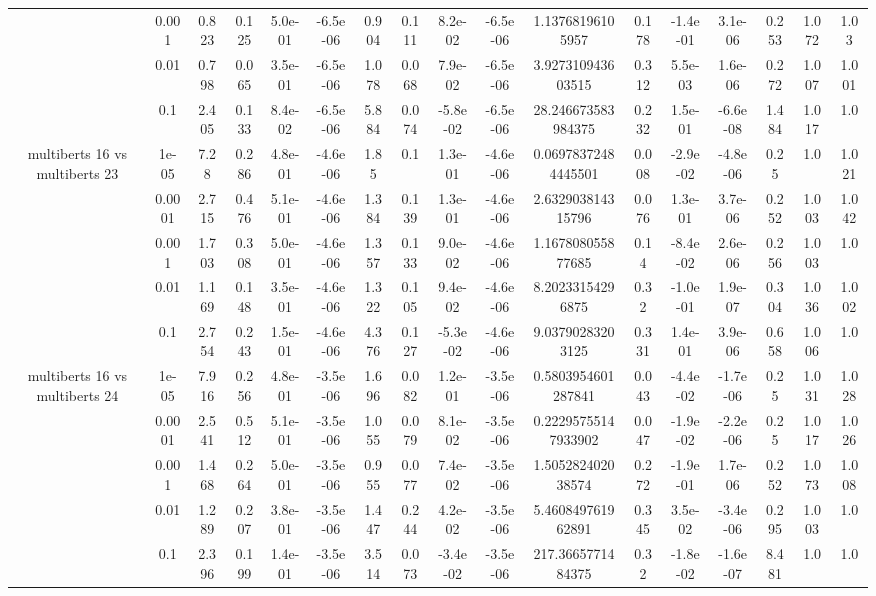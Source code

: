 \begin{tabular}{|c|c|c|c|c|c|c|c|c|c|c|c|c|c|c|c|c|}
 & 0.001 & 0.823 & 0.125 & 5.0e-01 & -6.5e-06 & 0.904 & 0.111 & 8.2e-02 & -6.5e-06 & 1.13768196105957 & 0.178 & -1.4e-01 & 3.1e-06 & 0.253 & 1.072 & 1.03 \\
 & 0.01 & 0.798 & 0.065 & 3.5e-01 & -6.5e-06 & 1.078 & 0.068 & 7.9e-02 & -6.5e-06 & 3.927310943603515 & 0.312 & 5.5e-03 & 1.6e-06 & 0.272 & 1.007 & 1.001 \\
 & 0.1 & 2.405 & 0.133 & 8.4e-02 & -6.5e-06 & 5.884 & 0.074 & -5.8e-02 & -6.5e-06 & 28.246673583984375 & 0.232 & 1.5e-01 & -6.6e-08 & 1.484 & 1.017 & 1.0 \\
\hline
\multirow{5}{*}{multiberts 16 vs multiberts 23} & 1e-05 & 7.28 & 0.286 & 4.8e-01 & -4.6e-06 & 1.85 & 0.1 & 1.3e-01 & -4.6e-06 & 0.06978372484445501 & 0.008 & -2.9e-02 & -4.8e-06 & 0.25 & 1.0 & 1.021 \\
 & 0.0001 & 2.715 & 0.476 & 5.1e-01 & -4.6e-06 & 1.384 & 0.139 & 1.3e-01 & -4.6e-06 & 2.632903814315796 & 0.076 & 1.3e-01 & 3.7e-06 & 0.252 & 1.003 & 1.042 \\
 & 0.001 & 1.703 & 0.308 & 5.0e-01 & -4.6e-06 & 1.357 & 0.133 & 9.0e-02 & -4.6e-06 & 1.167808055877685 & 0.14 & -8.4e-02 & 2.6e-06 & 0.256 & 1.003 & 1.0 \\
 & 0.01 & 1.169 & 0.148 & 3.5e-01 & -4.6e-06 & 1.322 & 0.105 & 9.4e-02 & -4.6e-06 & 8.20233154296875 & 0.32 & -1.0e-01 & 1.9e-07 & 0.304 & 1.036 & 1.002 \\
 & 0.1 & 2.754 & 0.243 & 1.5e-01 & -4.6e-06 & 4.376 & 0.127 & -5.3e-02 & -4.6e-06 & 9.03790283203125 & 0.331 & 1.4e-01 & 3.9e-06 & 0.658 & 1.006 & 1.0 \\
\hline
\multirow{5}{*}{multiberts 16 vs multiberts 24} & 1e-05 & 7.916 & 0.256 & 4.8e-01 & -3.5e-06 & 1.696 & 0.082 & 1.2e-01 & -3.5e-06 & 0.5803954601287841 & 0.043 & -4.4e-02 & -1.7e-06 & 0.25 & 1.031 & 1.028 \\
 & 0.0001 & 2.541 & 0.512 & 5.1e-01 & -3.5e-06 & 1.055 & 0.079 & 8.1e-02 & -3.5e-06 & 0.22295755147933902 & 0.047 & -1.9e-02 & -2.2e-06 & 0.25 & 1.017 & 1.026 \\
 & 0.001 & 1.468 & 0.264 & 5.0e-01 & -3.5e-06 & 0.955 & 0.077 & 7.4e-02 & -3.5e-06 & 1.505282402038574 & 0.272 & -1.9e-01 & 1.7e-06 & 0.252 & 1.073 & 1.008 \\
 & 0.01 & 1.289 & 0.207 & 3.8e-01 & -3.5e-06 & 1.447 & 0.244 & 4.2e-02 & -3.5e-06 & 5.460849761962891 & 0.345 & 3.5e-02 & -3.4e-06 & 0.295 & 1.003 & 1.0 \\
 & 0.1 & 2.396 & 0.199 & 1.4e-01 & -3.5e-06 & 3.514 & 0.073 & -3.4e-02 & -3.5e-06 & 217.3665771484375 & 0.32 & -1.8e-02 & -1.6e-07 & 8.481 & 1.0 & 1.0 \\

\end{tabular}
